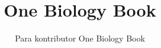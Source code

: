 \documentclass[11pt,a4paper,twoside,openany]{book}
\title{One Biology Book}
\author{Para kontributor One Biology Book}
\date{\bookdate}
\begin{document}
\frontmatter




\tableofcontents

\mainmatter





\appendix
\part{\omsolutionspart}




\backmatter
\renewcommand{\indexspace}{\par\vskip 8pt plus 4pt minus 4pt\relax}
\printindex
\end{document}
